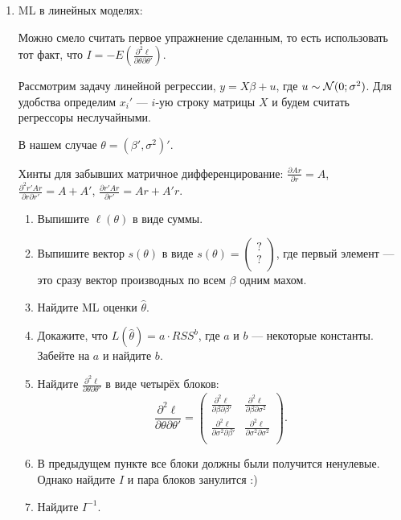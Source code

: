 \documentclass[12pt, a4paper]{article}
\begin{document}
\begin{enumerate}
\begin{enumerate}
\end{enumerate}

\item ML в линейных моделях:

Можно смело считать первое упражнение сделанным, то есть использовать тот факт, что $I=-E(\frac{\partial^2 \ell}{\partial \theta\partial\theta'})$.

Рассмотрим задачу линейной регрессии, $y=X\beta+u$, где $u\sim \mathcal{N}(0;\sigma^2)$. Для удобства определим $x_i'$ — $i$-ую строку матрицы $X$ и будем считать регрессоры неслучайными.

В нашем случае $\theta=(\beta', \sigma^2)'$.


Хинты для забывших матричное дифференцирование: $\frac{\partial Ar}{\partial r}=A$, $\frac{\partial^2 r'Ar}{\partial r\partial r'}=A+A'$, $\frac{\partial r'Ar}{\partial r'}=Ar+A'r$.

\begin{enumerate}
\item Выпишите $\ell(\theta)$ в виде суммы.
\item Выпишите вектор $s(\theta)$ в виде
$s(\theta) = \begin{pmatrix}
? \\
? \\
\end{pmatrix}$, где первый элемент — это сразу вектор производных по всем $\beta$ одним махом.
\item Найдите ML оценки $\hat\theta$.
\item Докажите, что $L(\hat\theta)=a \cdot RSS^{b}$, где $a$ и $b$ — некоторые константы. Забейте на $a$ и найдите $b$.
\item Найдите $\frac{\partial^2 \ell}{\partial \theta\partial\theta'}$ в виде четырёх блоков:
\[
\frac{\partial^2 \ell}{\partial \theta\partial\theta'}=\begin{pmatrix}
\frac{\partial^2 \ell}{\partial \beta\partial\beta'} & \frac{\partial^2 \ell}{\partial \beta\partial \sigma^2} \\
\frac{\partial^2 \ell}{\partial \sigma^2\partial\beta'} & \frac{\partial^2 \ell}{\partial \sigma^2\partial\sigma^2} \\
\end{pmatrix}.
\]
\item В предыдущем пункте все блоки должны были получится ненулевые. Однако найдите $I$ и пара блоков занулится :)
\item Найдите $I^{-1}$.
\end{enumerate}


\end{enumerate}
\end{document}
